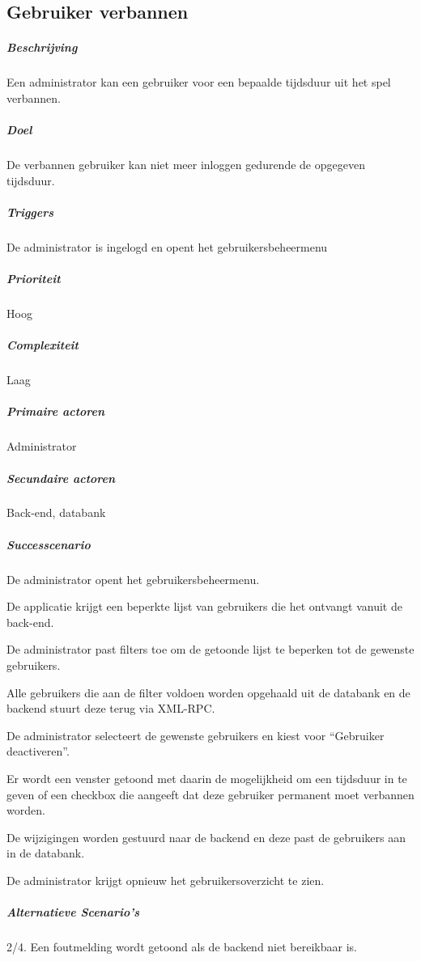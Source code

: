 \subsection{Gebruiker verbannen}
\begin{compact}
\subparagraph{Beschrijving} Een administrator kan een gebruiker voor een bepaalde tijdsduur uit het spel verbannen.
\subparagraph{Doel} De verbannen gebruiker kan niet meer inloggen gedurende de opgegeven tijdsduur.
\subparagraph{Triggers}De administrator is ingelogd en opent het gebruikersbeheermenu
\subparagraph{Prioriteit}Hoog
\subparagraph{Complexiteit}Laag
\subparagraph{Primaire actoren}Administrator
\subparagraph{Secundaire actoren}Back-end, databank
\subparagraph{Successcenario}
\begin{enumerate_compact}
 \item De administrator opent het gebruikersbeheermenu.
 \item De applicatie krijgt een beperkte lijst van gebruikers die het ontvangt vanuit de back-end.
 \item De administrator past filters toe om de getoonde lijst te beperken tot de gewenste gebruikers.
 \item Alle gebruikers die aan de filter voldoen worden opgehaald uit de databank en de backend stuurt deze terug via XML-RPC.
 \item De administrator selecteert de gewenste gebruikers en kiest voor ``Gebruiker deactiveren''.
 \item Er wordt een venster getoond met daarin de mogelijkheid om een tijdsduur in te geven of een checkbox die aangeeft dat deze gebruiker permanent moet verbannen worden.
 \item De wijzigingen worden gestuurd naar de backend en deze past de gebruikers aan in de databank.
 \item De administrator krijgt opnieuw het gebruikersoverzicht te zien.
\end{enumerate_compact}
\subparagraph{Alternatieve Scenario's}
\begin{enumerate_compact}
	\item[2/4.] Een foutmelding wordt getoond als de backend niet bereikbaar is.
\end{enumerate_compact}
\end{compact}

